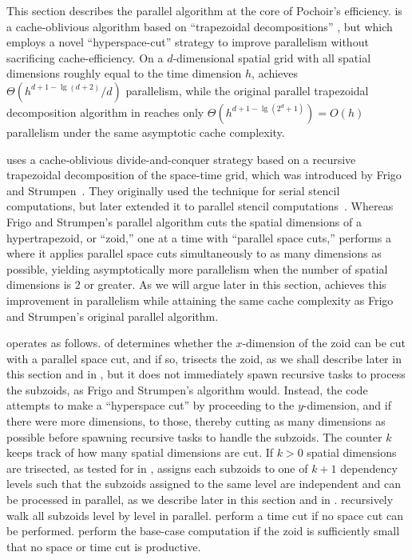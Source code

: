 
\newtheorem{mydef}{Definition}

This section describes the parallel algorithm  at the core
of Pochoir's efficiency.   is a cache-oblivious algorithm
based on ``trapezoidal decompositions'' \cite{FrigoSt05, FrigoSt09},
but which employs a novel ``hyperspace-cut'' strategy to improve
parallelism without sacrificing cache-efficiency.  On a
$d$-dimensional spatial grid with all spatial dimensions roughly equal
to the time dimension $h$,  achieves $\Theta(h^{ d + 1 - \lg{
      \left( d + 2 \right) } } / d )$ parallelism, while the original
parallel trapezoidal decomposition algorithm in \cite{FrigoSt09}
reaches only $\Theta(h^{ d + 1 - \lg{ \left( 2^d + 1 \right) } } ) =
O(h)$ parallelism under the same asymptotic cache complexity.

 uses a cache-oblivious \cite{FrigoLePr99}
divide-and-conquer strategy based on a recursive trapezoidal
decomposition of the space-time grid, which was introduced by Frigo
and Strumpen~\cite{FrigoSt05}.  They originally used the technique for
serial stencil computations, but later extended it to parallel stencil
computations~\cite{FrigoSt09}.  Whereas Frigo and Strumpen's parallel
algorithm cuts the spatial dimensions of a hypertrapezoid, or
``zoid,'' one at a time with ``parallel space cuts,'' 
performs a  where it applies parallel space cuts
simultaneously to as many dimensions as possible, yielding
asymptotically more parallelism when the number of spatial dimensions
is $2$ or greater.  As we will argue later in this section,
 achieves this improvement in parallelism while attaining
the same cache complexity as Frigo and Strumpen's original parallel
algorithm.

 operates as follows.   of
 determines whether the $x$-dimension of the zoid
can be cut with a parallel space cut, and if so,  trisects
the zoid, as we shall describe later in this section and in
, but it does not immediately spawn recursive tasks to
process the subzoids, as Frigo and Strumpen's algorithm would.
Instead, the code attempts to make a ``hyperspace cut'' by proceeding
to the $y$-dimension, and if there were more dimensions, to those,
thereby cutting as many dimensions as possible before spawning
recursive tasks to handle the subzoids.  The counter $k$ keeps track
of how many spatial dimensions are cut.  If $k>0$ spatial dimensions
are trisected, as tested for in ,  assigns
each subzoids to one of $k+1$ dependency levels such that the subzoids
assigned to the same level are independent and can be processed in
parallel, as we describe later in this section and in
.  
recursively walk all subzoids level by level in parallel.
 perform a time cut if no space
cut can be performed.  
perform the base-case computation if the zoid is sufficiently small
that no space or time cut is productive.

